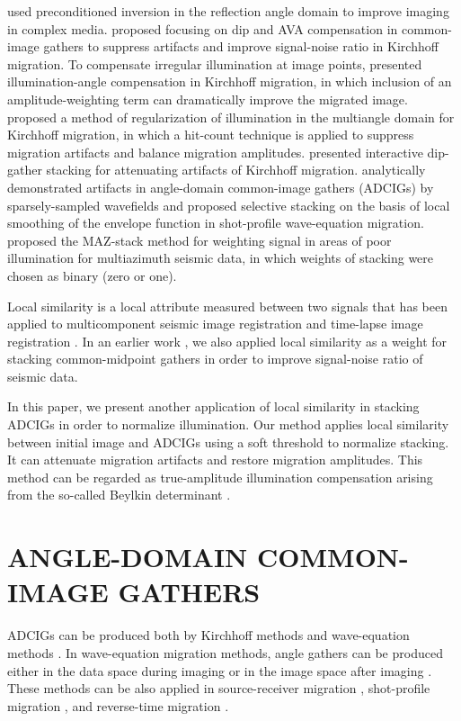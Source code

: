 \cite{Prucha,Kuhl} used preconditioned inversion in the reflection angle domain to 
improve imaging in complex media. \cite{Xu,Brandsberg} proposed focusing on dip and 
AVA compensation in common-image gathers to suppress artifacts and improve signal-noise ratio in Kirchhoff migration. 
To compensate irregular illumination at image points, \cite{Kessinger} presented illumination-angle compensation in 
Kirchhoff migration, in which inclusion of an amplitude-weighting term can dramatically improve the migrated image. 
\cite{Bloor,Audebert} proposed a method of regularization of illumination in the multiangle 
domain for Kirchhoff migration, in which a hit-count technique is applied to suppress migration artifacts and balance 
migration amplitudes. \cite{Qin} presented interactive dip-gather stacking for attenuating artifacts of Kirchhoff 
migration. \cite{Tang} analytically demonstrated artifacts in angle-domain common-image gathers (ADCIGs) by sparsely-sampled 
wavefields and proposed selective stacking on the basis of local smoothing of the envelope function in shot-profile wave-equation 
migration. \cite{Manning} proposed the MAZ-stack method for weighting signal in areas of poor illumination for multiazimuth 
seismic data, in which weights of stacking were chosen as binary (zero or one). 

Local similarity is a local attribute measured between two signals \cite[]{Fomel2007b} that has been applied to multicomponent 
seismic image registration \cite[]{Fomel2005,Fomel2007b} and time-lapse image registration \cite[]{Fomel2009}. 
In an earlier work \cite[]{Liu}, we also applied local similarity as a weight for stacking common-midpoint gathers 
in order to improve signal-noise ratio of seismic data. 

In this paper, we present another application of local similarity in stacking ADCIGs in order to normalize illumination. 
Our method applies local similarity between initial image and ADCIGs using a soft threshold to normalize stacking. It 
can attenuate migration artifacts and restore migration amplitudes. This method can be regarded as true-amplitude 
illumination compensation arising from the so-called Beylkin determinant \cite[]{Beylkin,Albertin,Audebert}. 

\section{ANGLE-DOMAIN COMMON-IMAGE GATHERS}

ADCIGs can be produced both by Kirchhoff methods \cite[]{Xu,Brandsberg} and wave-equation methods \cite[]{Prucha0,Mosher,Xie2002,Sava2003,Biondi2004}. In wave-equation migration methods, angle gathers can be produced either in the data space during imaging or in the image space after imaging \cite[]{Fomel2004}. These methods can be also applied in source-receiver migration \cite[]{Sava2003}, shot-profile migration \cite{Rickett}, and reverse-time migration \cite[]{Biondi2002,Zhang2007}.

